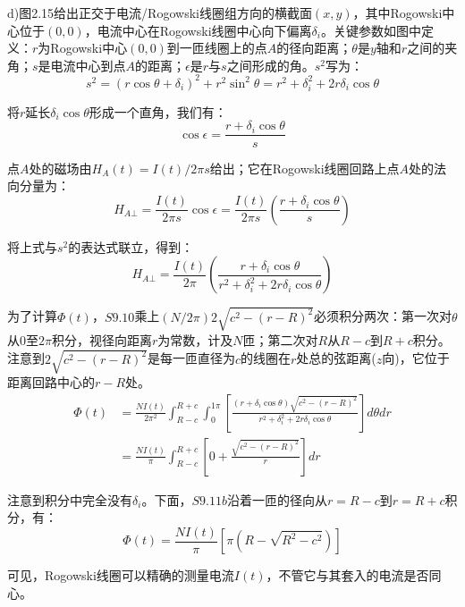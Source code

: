 d)图2.15给出正交于电流/Rogowski线圈组方向的横截面$(x,y)$，其中Rogowski中心位于$(0,0)$，电流中心在Rogowski线圈中心向下偏离$\delta_i$。关键参数如图中定义：$r$为Rogowski中心$(0,0)$到一匝线圈上的点$A$的径向距离；$\theta$是$y$轴和$r$之间的夹角；$s$是电流中心到点$A$的距离；$\epsilon$是$r$与$s$之间形成的角。$s^2$写为：
\begin{equation*}
s^2=(r\cos\theta+\delta_i)^2+r^2\sin^2\theta=r^2+\delta_i^2+2r\delta_i\cos\theta \tag{S9.7}
\end{equation*}

将$r$延长$\delta_i \cos\theta$形成一个直角，我们有：
\begin{equation*}
\cos\epsilon=\frac{r+\delta_i \cos\theta}{s} \tag{S9.8}
\end{equation*}

点$A$处的磁场由$H_A(t)=I(t)/2\pi s$给出；它在Rogowski线圈回路上点$A$处的法向分量为：
\begin{equation*}
H_{A\bot}=\frac{I(t)}{2\pi s}\cos\epsilon=\frac{I(t)}{2\pi s}(\frac{r+\delta_i \cos\theta}{s}) \tag{S9.9}
\end{equation*}

将上式与$s^2$的表达式联立，得到：
\begin{equation*}
H_{A\bot}=\frac{I(t)}{2\pi}\left(\frac{r+\delta_i \cos\theta}{r^2+\delta_i^2+2r\delta_i\cos\theta}\right) \tag{S9.10}
\end{equation*}

为了计算$\Phi(t)$，$S9.10$乘上$(N/2\pi)2\sqrt{c^2−(r−R)^2}$必须积分两次：第一次对$\theta$从$0$至$2\pi$积分，视径向距离$r$为常数，计及$N$匝；第二次对$R$从$R-c$到$R+c$积分。注意到$2\sqrt{c^2−(r−R)^2}$是每一匝直径为$c$的线圈在$r$处总的弦距离($z$向)，它位于距离回路中心的$r-R$处。
\begin{align}
\Phi(t)&=\frac{N I(t)}{2\pi^2}\int_{R-c}^{R+c}\int_{0}^{1\pi}\left[ \frac{(r+\delta_i \cos\theta)\sqrt{c^2-(r-R)^2}}{r^2+\delta_i^2+2r\delta_i \cos\theta}\right]d\theta dr\nonumber\tag{S9.11a}\\
&=\frac{N I(t)}{\pi}\int_{R-c}^{R+c} \left[ 0+\frac{\sqrt{c^2-(r-R)^2}}{r}\right]dr\nonumber\tag{S9.11b}
\end{align}

注意到积分中完全没有$\delta_i$。下面，$S9.11b$沿着一匝的径向从$r=R-c$到$r=R+c$积分，有：
\begin{equation*}
\Phi(t)=\frac{N I(t)}{\pi}\left[ \pi(R-\sqrt{R^2-c^2})\right] \tag{S9.11c}
\end{equation*}

可见，Rogowski线圈可以精确的测量电流$I(t)$，不管它与其套入的电流是否同心。

